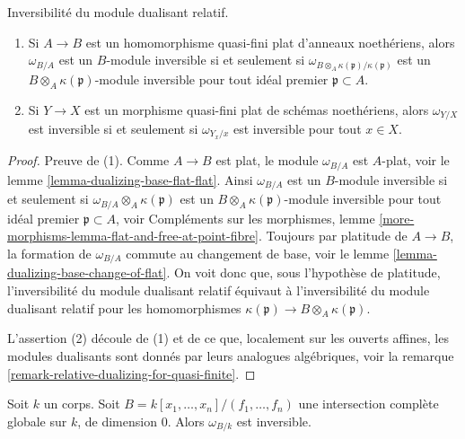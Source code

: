 \begin{lemma}
\label{lemma-characterize-invertible}
Inversibilité du module dualisant relatif.
\begin{enumerate}
\item Si $A \to B$ est un homomorphisme quasi-fini plat d'anneaux noethériens,
alors $\omega_{B/A}$ est un $B$-module inversible si et seulement si
$\omega_{B \otimes_A \kappa(\mathfrak p)/\kappa(\mathfrak p)}$
est un $B \otimes_A \kappa(\mathfrak p)$-module inversible
pour tout idéal premier $\mathfrak p \subset A$.
\item Si $Y \to X$ est un morphisme quasi-fini plat de
schémas noethériens, alors $\omega_{Y/X}$ est inversible
si et seulement si $\omega_{Y_x/x}$ est inversible pour tout $x \in X$.
\end{enumerate}
\end{lemma}

\begin{proof}
Preuve de (1). Comme $A \to B$ est plat, le module
$\omega_{B/A}$ est $A$-plat, voir le lemme \ref{lemma-dualizing-base-flat-flat}.
Ainsi $\omega_{B/A}$ est un $B$-module inversible si et seulement si
$\omega_{B/A} \otimes_A \kappa(\mathfrak p)$
est un $B \otimes_A \kappa(\mathfrak p)$-module inversible pour
tout idéal premier $\mathfrak p \subset A$, voir Compléments sur les morphismes, lemme
\ref{more-morphisms-lemma-flat-and-free-at-point-fibre}.
Toujours par platitude de $A \to B$, la
formation de $\omega_{B/A}$ commute au changement de base, voir le
lemme \ref{lemma-dualizing-base-change-of-flat}.
On voit donc que, sous l'hypothèse de platitude, l'inversibilité du module dualisant relatif
équivaut à l'inversibilité
du module dualisant relatif pour les homomorphismes
$\kappa(\mathfrak p) \to B \otimes_A \kappa(\mathfrak p)$.

\medskip\noindent
L'assertion (2) découle de (1) et de ce que, localement sur les ouverts affines,
les modules dualisants sont donnés par leurs analogues algébriques, voir la
remarque \ref{remark-relative-dualizing-for-quasi-finite}.
\end{proof}

\begin{lemma}
\label{lemma-dim-zero-global-complete-intersection-over-field}
Soit $k$ un corps. Soit $B = k[x_1, \ldots, x_n]/(f_1, \ldots, f_n)$
une intersection complète globale sur $k$, de dimension $0$.
Alors $\omega_{B/k}$ est inversible.
\end{lemma}

